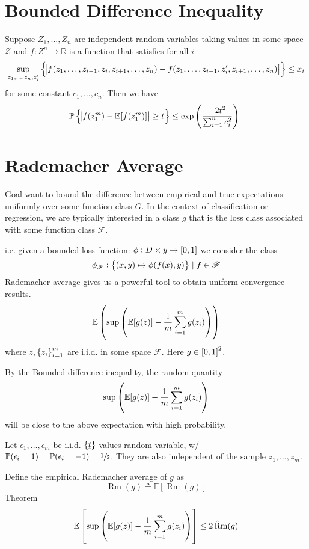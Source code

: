 \documentclass{article}
\newcommand{\RR}{\mathbb{R}}
\begin{document}
\section{Bounded Difference Inequality}

Suppose \(Z_1, \dots, Z_n\) are independent random variables taking values in some space \(\mathcal{Z}\) and \(f : Z^n \to \RR\) is a function that satisfies for all \(i\)
\[\sup_{z_1, \dots, z_n, z_i'} \set{\abs{f(z_1, \dots, z_{i-1}, z_i, z_{i+1} , \dots, z_n) - f(z_1, \dots, z_{i-1}, z_i', z_{i+1} , \dots, z_n)}} \leq x_i\]
for some constant \(c_1, \dots, c_n\).
Then we have
\[\mathbb P \set{\abs{f(z_1^m) - \mathbb E[f(z_1^m)]} \geq t} \leq \exp\del{\frac{-2t^2}{\sum_{i=1}^nc_i^2}}.\]

\section{Rademacher Average}

Goal want to bound the difference between empirical and true expectations uniformly over some function class \(G\).
In the context of classification or regression, we are typically interested in a class \(g\) that is the loss class associated with some function class \(\mathscr{F}\).

i.e. given a bounded loss function: \(\phi: D \times y \to \intcc{0, 1}\) we consider the class
\[\phi_{\mathscr{F}} : \set{(x , y) \mapsto \phi(f(x), y)} \mid f \in \mathscr{F}\]
Rademacher average gives us a powerful tool to obtain uniform convergence results.
\[\mathbb E \del{\sup \del{\mathbb E[g(z)] - \frac{1}{m}\sum_{i=1}^mg(z_i)}}\]
where \(z, \set{z_i}_{i=1}^m\) are i.i.d. in some space \(\mathscr{F}\).
Here \(g \in \intcc{0, 1}^2\).

By the Bounded difference inequality, the random quantity
\[\sup \del{\mathbb E [g(z)] - \frac{1}{m}\sum_{i=1}^m g(z_i)}\]
will be close to the above expectation with high probability.

Let \(\epsilon_1, \dots, \epsilon_m\) be i.i.d. \(\set{\underline{t}}\)-values random variable, w/ \(\mathbb P(\epsilon_i = 1) =\mathbb P(\epsilon_i = -1) = \sfrac{1}{2}\).
They are also independent of the sample \(z_1, \dots, z_m\).

Define the empirical Rademacher average of \(g\) as
\[\mathop{\text{\^Rm}}(g) \triangleq \mathbb E[\mathop{\text{\^Rm}}(g)]\]
Theorem
\[\mathbb E \sbr{\sup \del{\mathbb E [g(z)] - \frac{1}{m}\sum_{i=1}^m g(z_i)}} \leq 2\mathop{\text{\^Rm}}(g)\]
\end{document}
